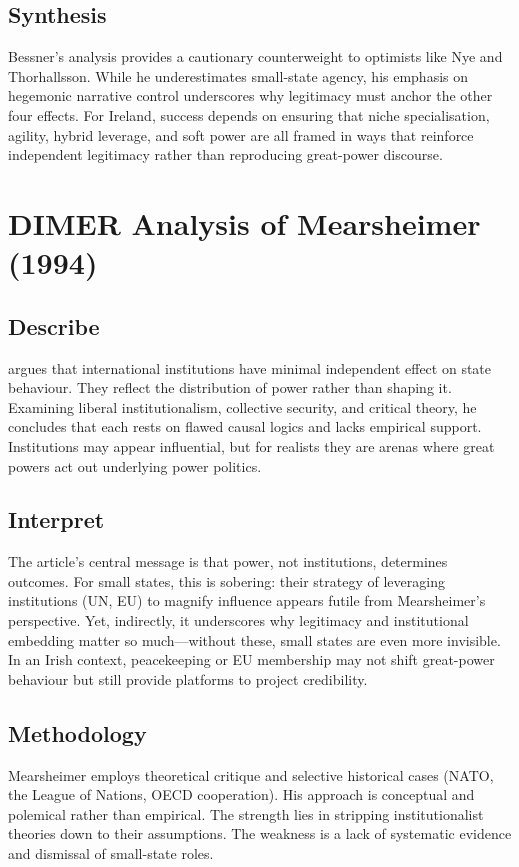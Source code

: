 \subsection*{Synthesis}
Bessner’s analysis provides a cautionary counterweight to optimists like Nye and Thorhallsson. While he underestimates small-state agency, his emphasis on hegemonic narrative control underscores why legitimacy must anchor the other four effects. For Ireland, success depends on ensuring that niche specialisation, agility, hybrid leverage, and soft power are all framed in ways that reinforce independent legitimacy rather than reproducing great-power discourse.

\section*{DIMER Analysis of Mearsheimer (1994)}

\subsection*{Describe}
\textcite{MEARSHEIMER_1994} argues that international institutions have minimal independent effect on state behaviour. They reflect the distribution of power rather than shaping it. Examining liberal institutionalism, collective security, and critical theory, he concludes that each rests on flawed causal logics and lacks empirical support. Institutions may appear influential, but for realists they are arenas where great powers act out underlying power politics.

\subsection*{Interpret}
The article’s central message is that power, not institutions, determines outcomes. For small states, this is sobering: their strategy of leveraging institutions (UN, EU) to magnify influence appears futile from Mearsheimer’s perspective. Yet, indirectly, it underscores why legitimacy and institutional embedding matter so much—without these, small states are even more invisible. In an Irish context, peacekeeping or EU membership may not shift great-power behaviour but still provide platforms to project credibility.

\subsection*{Methodology}
Mearsheimer employs theoretical critique and selective historical cases (NATO, the League of Nations, OECD cooperation). His approach is conceptual and polemical rather than empirical. The strength lies in stripping institutionalist theories down to their assumptions. The weakness is a lack of systematic evidence and dismissal of small-state roles.

